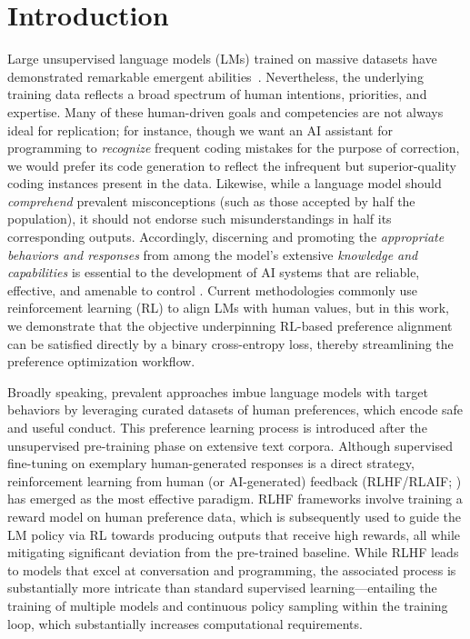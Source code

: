 \section{Introduction}
Large unsupervised language models (LMs) trained on massive datasets have demonstrated remarkable emergent abilities~\citep{chowdhery2022palm, brown2020language, touvron2023llama,bubeck2023sparks}. Nevertheless, the underlying training data reflects a broad spectrum of human intentions, priorities, and expertise. Many of these human-driven goals and competencies are not always ideal for replication; for instance, though we want an AI assistant for programming to \textit{recognize} frequent coding mistakes for the purpose of correction, we would prefer its code generation to reflect the infrequent but superior-quality coding instances present in the data. Likewise, while a language model should \textit{comprehend} prevalent misconceptions (such as those accepted by half the population), it should not endorse such misunderstandings in half its corresponding outputs. Accordingly, discerning and promoting the \emph{appropriate behaviors and responses} from among the model’s extensive \textit{knowledge and capabilities} is essential to the development of AI systems that are reliable, effective, and amenable to control \citep{ouyang2022training}. Current methodologies commonly use reinforcement learning (RL) to align LMs with human values, but in this work, we demonstrate that the objective underpinning RL-based preference alignment can be satisfied directly by a binary cross-entropy loss, thereby streamlining the preference optimization workflow.

Broadly speaking, prevalent approaches imbue language models with target behaviors by leveraging curated datasets of human preferences, which encode safe and useful conduct. This preference learning process is introduced after the unsupervised pre-training phase on extensive text corpora. Although supervised fine-tuning on exemplary human-generated responses is a direct strategy, reinforcement learning from human (or AI-generated) feedback (RLHF/RLAIF; \citep{christiano2017deep,bai2022constitutional}) has emerged as the most effective paradigm. RLHF frameworks involve training a reward model on human preference data, which is subsequently used to guide the LM policy via RL towards producing outputs that receive high rewards, all while mitigating significant deviation from the pre-trained baseline. While RLHF leads to models that excel at conversation and programming, the associated process is substantially more intricate than standard supervised learning—entailing the training of multiple models and continuous policy sampling within the training loop, which substantially increases computational requirements.

